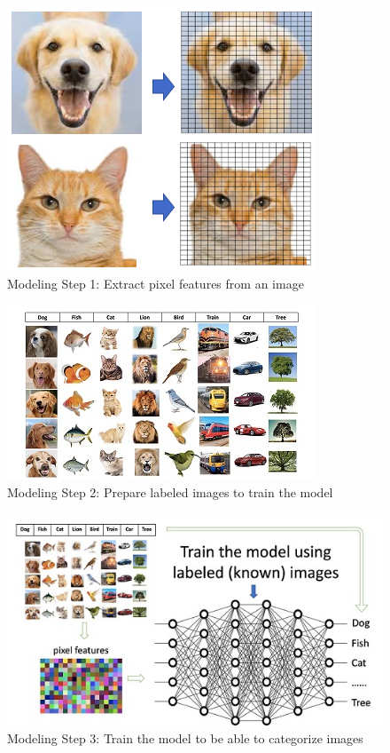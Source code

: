 \documentclass[12pt]{article}
\begin{document}
\begin{figure}[!h]
\center
\includegraphics{1_OWDPIiViwu64x8SM3dy7iA.png}
\caption{Modeling Step 1: Extract pixel features from an image}
\end{figure}
\begin{figure}[!h]
\center
\includegraphics{1_wCcVUiUJlGXEu42pc4KKgQ.jpeg}
\caption{Modeling Step 2: Prepare labeled images to train the model}
\end{figure}
\newpage
\begin{figure}[!h]
\center
\includegraphics{1_fx3TuPJ_N49W4HAqpRU8TA.jpeg}
\caption{Modeling Step 3: Train the model to be able to categorize images}
\end{figure}
\end{document}
